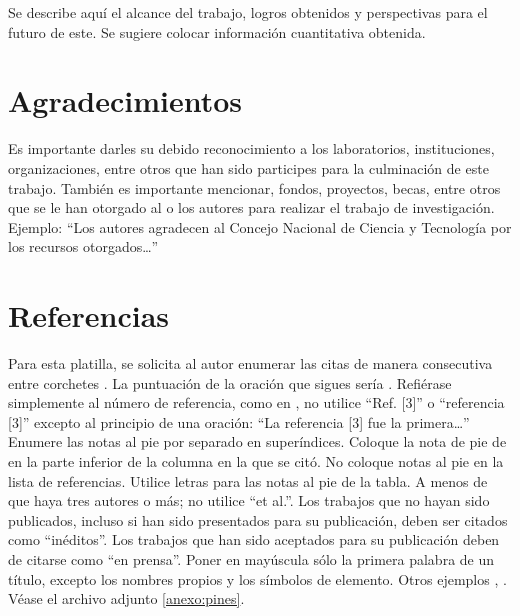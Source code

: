             Se describe aquí el alcance del trabajo, logros obtenidos y perspectivas para el futuro de este. Se sugiere colocar información cuantitativa obtenida.
            
            \section{Agradecimientos}
            
            Es importante darles su debido reconocimiento a los laboratorios, instituciones, organizaciones, entre otros que han sido participes para la culminación de este trabajo. También es importante mencionar, fondos, proyectos, becas, entre otros que se le han otorgado al o los autores para realizar el trabajo de investigación. Ejemplo: “Los autores agradecen al Concejo Nacional de Ciencia y Tecnología por los recursos otorgados…”
            
            \section*{Referencias}
            
            Para esta platilla, se solicita al autor enumerar las citas de manera consecutiva entre corchetes \cite{YLi2013}. 
            La puntuación de la oración que sigues sería \cite{Mesaelides2011}. 
            Refiérase simplemente al número de referencia, como en \cite{Morales2012}, no utilice “Ref. [3]” o “referencia [3]” excepto al principio de una oración: “La referencia [3] fue la primera…”
            Enumere las notas al pie por separado en superíndices. Coloque la nota de pie de en la parte inferior de la columna en la que se citó. No coloque notas al pie en la lista de referencias. Utilice letras para las notas al pie de la tabla.
            A menos de que haya tres autores o más; no utilice “et al.”. Los trabajos que no hayan sido publicados, incluso si han sido presentados para su publicación, deben ser citados como “inéditos”. Los trabajos que han sido aceptados para su publicación deben de citarse como “en prensa”. Poner en mayúscula sólo la primera palabra de un título, excepto los nombres propios y los símbolos de elemento. 
            Otros ejemplos \cite{LAAngeles2021}, \cite{LAAngelesConni}. 
            Véase el archivo adjunto \ref{anexo:pines}.
            
            
